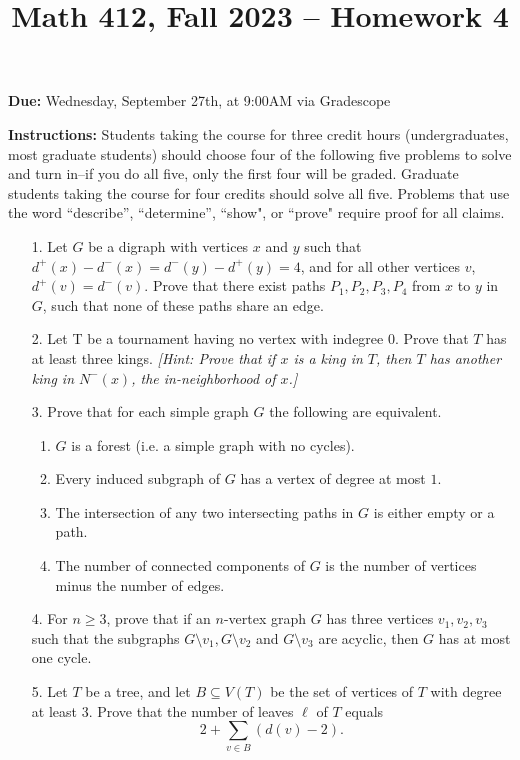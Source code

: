 \documentclass[12pt]{article}
\title{Math 412, Fall 2023 -- Homework 4}
\date{}
\begin{document}
 \maketitle
\vspace{-80pt}

\textbf{Due:} Wednesday, September 27th, at 9:00AM via Gradescope

\textbf{Instructions:} Students taking the course for three credit hours (undergraduates, most graduate
students) should choose four of the following five problems to solve and turn in--if you do all five, only the first four will be graded. Graduate students
taking the course for four credits should solve all five. Problems that use the word ``describe”,
``determine”, ``show", or ``prove" require proof for all claims.

\begin{enumerate}

\item[1.] Let $G$ be a digraph with vertices $x$ and $y$ such that $d^+(x)-d^-(x)=d^-(y)-d^+(y)=4$, and for all other vertices $v$, $d^+(v)=d^-(v)$. Prove that there exist paths $P_1,P_2,P_3,P_4$ from $x$ to $y$ in $G$, such that none of these paths share  an edge.

\item[2.]  Let T be a tournament having no vertex with indegree $0$. Prove that $T$ has at least three kings. \emph{[Hint: Prove that if $x$ is a king in $T$, then $T$ has another king in $N^-(x)$, the in-neighborhood of $x$.]}

\item[3.] Prove that for each simple graph $G$  the following are equivalent.

\begin{enumerate}
\item $G$ is a forest (i.e. a simple graph with no cycles).
\item Every induced subgraph of $G$ has a vertex of degree at most $1$.
\item The intersection of any two intersecting paths in $G$ is either empty or a path. 
\item The number of connected components of $G$ is the number of vertices minus the number of edges.
\end{enumerate}


\item[4.] For $n\geq 3$, prove that if an $n$-vertex graph $G$ has  three vertices $v_1,v_2,v_3$ such that the subgraphs $G\setminus v_1,G\setminus v_2$ and  $G\setminus v_3$ are acyclic, then $G$ has at most one cycle.

\item[5.] Let $T$ be a tree, and let $B\subseteq V(T)$ be the set of vertices of $T$ with degree at least 3. Prove that the number of leaves $\ell$ of $T$ equals \[2 + \sum_{v\in B} (d(v)-2).\]

\end{enumerate}
\end{document}
